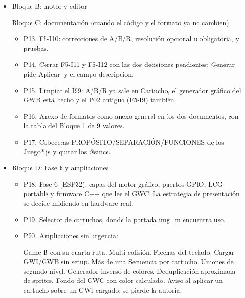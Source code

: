 \begin{itemize}
\item Bloque B: motor y editor
Bloque C: documentación (cuando el código y el formato ya no cambien)
\begin{itemize}
	\item P13. F5-I10: correcciones de A/B/R, resolución opcional u obligatoria, y pruebas.
	\item P14. Cerrar F5-I11 y F5-I12 con las dos decisiones pendientes: Generar pide Aplicar, y el campo descripcion.
	\item P15. Limpiar el I99: A/B/R ya sale en Cartucho, el generador gráfico del GWB está hecho y el P02 antiguo (F5-I9) también.
	\item P16. Anexo de formatos como anexo general en los dos documentos, con la tabla del Bloque 1 de 9 valores.
	\item P17. Cabeceras PROPÓSITO/SEPARACIÓN/FUNCIONES de los Juego*.js y quitar los @since.
\end{itemize}
\item Bloque D: Fase 6 y ampliaciones
\begin{itemize}
	\item P18. Fase 6 (ESP32): capas del motor gráfico, puertos GPIO, LCG portable y firmware C++ que lee el GWC.
	La estrategia de presentación se decide midiendo en hardware real.
	\item P19. Selector de cartuchos, donde la portada img_m encuentra uso.
	\item P20. Ampliaciones sin urgencia:
	\begin{itemize}
		Game B con su cuarta ruta.
		Multi-colisión.
		Flechas del teclado.
		Cargar GWI/GWB sin setup.
		Más de una Secuencia por cartucho.
		Uniones de segundo nivel.
		Generador inverso de colores.
		Deduplicación aproximada de sprites.
		Fondo del GWC con color calculado.
		Aviso al aplicar un cartucho sobre un GWI cargado: se pierde la autoría.
	\end{itemize}
\end{itemize}

\end{itemize}


